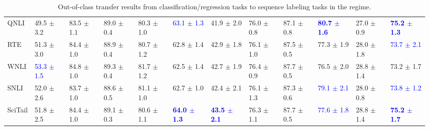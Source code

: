 \begin{landscape}
\begin{table}[t]
\begin{adjustbox}{max width=2\textwidth}
\begin{tabular}{ l l l l l  l l l l  l l l }
QNLI & 49.5 $\pm$ 3.2 & 83.5 $\pm$ 1.1 & 89.0 $\pm$ 0.4 & 80.3 $\pm$ 1.0 & \textcolor{blue}{63.1 $\pm$ 1.3} & 41.9 $\pm$ 2.0 & 76.0 $\pm$ 0.8 & 87.1 $\pm$ 0.8 & \textbf{\textcolor{blue}{80.7 $\pm$ 1.6}} & 27.0 $\pm$ 0.9 & \textbf{\textcolor{blue}{75.2 $\pm$ 1.3}}\\
RTE & 51.3 $\pm$ 3.0 & 84.4 $\pm$ 1.0 & 88.9 $\pm$ 0.4 & 80.7 $\pm$ 1.2 & 62.8 $\pm$ 1.4 & 42.9 $\pm$ 1.8 & 76.1 $\pm$ 1.0 & 87.5 $\pm$ 0.5 & 77.3 $\pm$ 1.9 & 28.0 $\pm$ 1.8 & \textcolor{blue}{73.7 $\pm$ 2.1}\\
WNLI & \textcolor{blue}{53.3 $\pm$ 1.5} & 84.8 $\pm$ 1.0 & 89.3 $\pm$ 0.4 & 81.7 $\pm$ 1.2 & 62.5 $\pm$ 1.4 & 42.7 $\pm$ 1.9 & 76.4 $\pm$ 0.9 & 87.7 $\pm$ 0.5 & 76.5 $\pm$ 2.0 & 28.8 $\pm$ 1.4 & 73.2 $\pm$ 1.7\\
SNLI & 52.0 $\pm$ 2.6 & 83.7 $\pm$ 1.0 & 88.6 $\pm$ 0.5 & 81.1 $\pm$ 1.0 & 62.7 $\pm$ 1.0 & 42.4 $\pm$ 2.1 & 76.1 $\pm$ 1.3 & 87.3 $\pm$ 0.6 & \textcolor{blue}{79.1 $\pm$ 2.1} & 28.0 $\pm$ 0.8 & \textcolor{blue}{73.8 $\pm$ 1.2}\\
SciTail & 51.8 $\pm$ 2.5 & 84.4 $\pm$ 1.0 & 89.1 $\pm$ 0.3 & 80.6 $\pm$ 1.1 & \textbf{\textcolor{blue}{64.0 $\pm$ 1.3}} & \textbf{\textcolor{blue}{43.5 $\pm$ 2.1}} & 76.3 $\pm$ 1.1 & 87.7 $\pm$ 0.5 & \textcolor{blue}{77.6 $\pm$ 1.8} & 28.8 $\pm$ 1.4 & \textbf{\textcolor{blue}{75.2 $\pm$ 1.7}}\\
\bottomrule
\end{tabular}
\end{adjustbox}
\caption{Out-of-class transfer results from classification/regression tasks to sequence labeling tasks in the  regime.}
\label{tbla11b}
\end{table}
\end{landscape}
